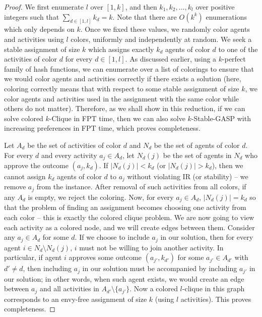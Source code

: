 \begin{proof}
	 We first enumerate $l$ over $[1, k]$, and then $k_1, k_2, \dots, k_l$ over positive integers such that $\sum_{d \in [1,l]} k_d = k$. Note that there are $O(k^k)$ enumerations which only depends on $k$. Once we fixed these values, we randomly color agents and activities using $l$ colors, uniformly and independently at random. We seek a stable assignment of size $k$ which assigns exactly $k_d$ agents of color $d$ to one of the activities of color $d$ for every $d\in [1, l]$. As discussed earlier, using a $k$-perfect family of hash functions, we can enumerate over a list of colorings to ensure that we would color agents and activities correctly if there exists a solution (here, coloring correctly means that with respect to some stable assignment of size $k$, we color agents and activities used in the assignment with the same color while others do not matter). Therefore, as we shall show in this reduction, if we can solve colored $k$-Clique in FPT time, then we can also solve $k$-Stable-GASP with increasing preferences in FPT time, which proves completeness. 
	
	Let $A_d$ be the set of activities of color $d$ and $N_d$ be the set of agents of color $d$. For every $d$ and every activity $a_j \in A_d$, let $N_d(j)$ be the set of agents in $N_d$ who approve the outcome $(a_j, k_d)$. If $|N_d(j)| < k_d$ (or $|N_d(j)| > k_d$), then we cannot assign $k_d$ agents of color $d$ to $a_j$ without violating IR (or stability) -- we remove $a_j$ from the instance. After removal of such activities from all colors, if any $A_d$ is empty, we reject the coloring. Now, for every $a_j\in A_d$, $|N_d(j)| = k_d$ so that the problem of finding an assignment becomes choosing one activity from each color -- this is exactly the colored clique problem. We are now going to view each activity as a colored node, and we will create edges between them. 	
	 Consider any $a_j\in A_d$ for some $d$. If we choose to include $a_j$ in our solution, then for every agent $i \in N_d \setminus N_d(j)$, $i$ must not be willing to join another activity. In particular, if agent $i$ approves some outcome $(a_{j'}, k_{d'})$ for some $a_{j'} \in A_{d'}$ with $d'\neq d$, then including $a_j$ in our solution must be accompanied by including $a_{j'}$ in our solution; in other words, when such agent exists, we would create an edge between $a_j$ and all activities in $A_{d'} \setminus \{a_{j'}\}$. Now a colored $l$-clique in this graph corresponds to an envy-free assignment of size $k$ (using $l$ activities). This proves completeness.
	
	

\end{proof}

